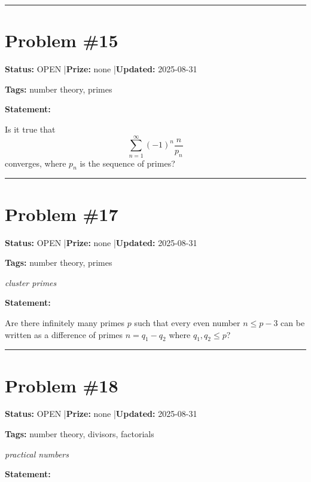 \documentclass{article}
\begin{document}
\noindent\rule{\linewidth}{0.4pt}


\section{Problem \#15}
\label{prob:15}

\noindent\textbf{Status:} OPEN \quad|\quad \textbf{Prize:} none \quad|\quad \textbf{Updated:} 2025-08-31

\noindent\textbf{Tags:} number theory, primes

\medskip

\noindent\textbf{Statement:}

Is it true that\[\sum_{n=1}^\infty(-1)^n\frac{n}{p_n}\]converges, where $p_n$ is the sequence of primes?

\noindent\rule{\linewidth}{0.4pt}


\section{Problem \#17}
\label{prob:17}

\noindent\textbf{Status:} OPEN \quad|\quad \textbf{Prize:} none \quad|\quad \textbf{Updated:} 2025-08-31

\noindent\textbf{Tags:} number theory, primes

\medskip
\noindent\textit{cluster primes}


\noindent\textbf{Statement:}

Are there infinitely many primes $p$ such that every even number $n\leq p-3$ can be written as a difference of primes $n=q_1-q_2$ where $q_1,q_2\leq p$?

\noindent\rule{\linewidth}{0.4pt}


\section{Problem \#18}
\label{prob:18}

\noindent\textbf{Status:} OPEN \quad|\quad \textbf{Prize:} none \quad|\quad \textbf{Updated:} 2025-08-31

\noindent\textbf{Tags:} number theory, divisors, factorials

\medskip
\noindent\textit{practical numbers}


\noindent\textbf{Statement:}
\end{document}
